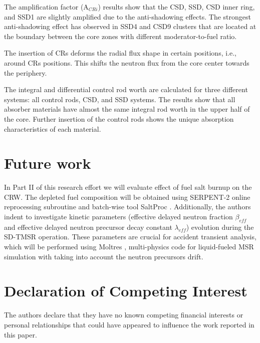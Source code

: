 The amplification factor (A$_{CRi}$) results show that the CSD, SSD, CSD inner ring, and SSD1 are slightly amplified due to the anti-shadowing effects. The strongest anti-shadowing effect has observed in SSD4 and CSD9 clusters that are located at the boundary between the core zones with different moderator-to-fuel ratio.

The insertion of CRs deforms the radial flux shape in certain positions, i.e., around CRs positions. This shifts the neutron flux from the core center towards the periphery.

The integral and differential control rod worth are calculated for three 
different systems: all control rods, CSD, and SSD systems. The results show 
that all absorber materials have almost the same integral rod worth in the 
upper half of the core. Further insertion of the control rods shows the unique 
absorption characteristics of each material.

\section{Future work}
In Part II of this research effort we will evaluate effect of fuel salt 
burnup on the CRW. The depleted fuel composition will be obtained using 
SERPENT-2 online reprocessing subroutine \cite{aufiero2013extended} and 
batch-wise tool SaltProc \cite{rykhlevskii_arfc/saltproc_2018, 
rykhlevskii_milestone_2019}. Additionally, the authors indent to investigate 
kinetic parameters (effective delayed neutron fraction $\beta_{eff}$ and 
effective delayed neutron precursor decay constant $\lambda_{eff}$) evolution 
during the SD-TMSR operation. These parameters are crucial for accident 
transient analysis, which will be performed using Moltres 
\cite{lindsay_introduction_2018}, multi-physics code for liquid-fueled MSR 
simulation with taking into account the neutron precursors drift.





\section{Declaration of Competing Interest}

The authors declare that they have no known competing financial interests or personal relationships that could have appeared to influence the work reported in this paper.
